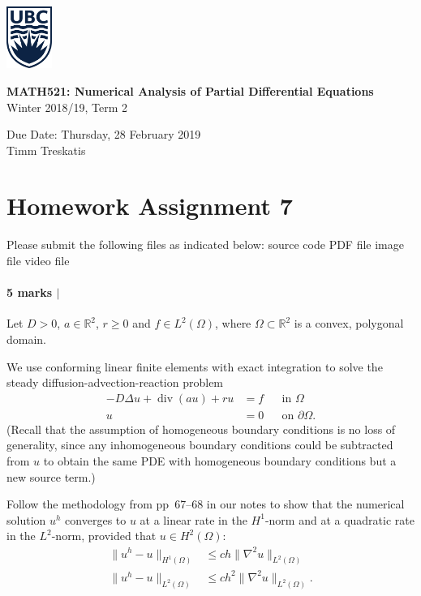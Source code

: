 \documentclass[10pt,letterpaper]{scrartcl}
\renewcommand{\div}{\operatorname{div}}
\begin{document}
\begin{minipage}{.2\textwidth}
\includegraphics[width=42pt]{ubc-logo.png}
\end{minipage}
\hfill
\begin{minipage}{.75\textwidth}
\setlength{\parskip}{6pt}
\begin{flushright}
{
\sffamily
\textbf{MATH521: Numerical Analysis of Partial Differential Equations}\\
Winter 2018/19, Term 2

Due Date: Thursday, 28 February 2019\\
Timm Treskatis
}
\end{flushright}
\end{minipage}

\section*{Homework Assignment 7}

Please submit the following files as indicated below: \hfill \faFileCodeO \: source code \hfill \faFilePdfO \: PDF file \hfill \faFilePictureO \: image file \hfill \faFileMovieO \: video file

\paragraph*{5 marks $\vert$ \faFilePdfO}

Let $D>0$, $a\in\mathds{R}^2$, $r\geq 0$ and $f\in L^2(\Omega)$, where $\Omega\subset \mathds{R}^2$ is a convex, polygonal domain.

We use conforming linear finite elements with exact integration to solve the steady diffusion-advection-reaction problem
\begin{align*}
-D \Delta u + \div(au) + ru &= f && \text{in } \Omega\\
u &= 0 && \text{on } \partial\Omega.
\end{align*}
(Recall that the assumption of homogeneous boundary conditions is no loss of generality, since any inhomogeneous boundary conditions could be subtracted from $u$ to obtain the same PDE with homogeneous boundary conditions but a new source term.)

Follow the methodology from pp~67--68 in our notes to show that the numerical solution $u^h$ converges to $u$ at a linear rate in the $H^1$-norm and at a quadratic rate in the $L^2$-norm, provided that $u \in H^2(\Omega)$:
\begin{align}
\lVert u^h - u \rVert_{H^1(\Omega)} &\leq c h \lVert \nabla^2 u \rVert_{L^2(\Omega)}\\
\lVert u^h - u \rVert_{L^2(\Omega)} &\leq c h^2 \lVert \nabla^2 u \rVert_{L^2(\Omega)}.
\end{align}
\end{document}
